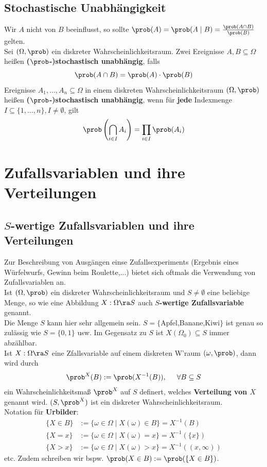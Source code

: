 \documentclass{kit}
\begin{document}
  \subsection{Stochastische Unabhängigkeit}
    Wir $A$ nicht von $B$ beeinflusst, so sollte $\prob(A)=\prob(A\mid B)=\frac{\prob(A\cap B)}{\prob(B)}$ gelten.\\
    Sei $(\Omega,\prob)$ ein diskreter Wahrscheinlichkeitsraum. Zwei Ereignisse $A,B\subseteq\Omega$ heißen
    \textbf{($\prob$-)stochastisch unabhängig}, falls
    $$\prob(A\cap B)=\prob(A)\cdot\prob(B)$$
    Ereignisse $A_1,\dots,A_n\subseteq\Omega$ in einem diskreten Wahrscheinlichkeitsraum $(\Omega,\prob)$ heißen
    \textbf{($\prob$-)stochastisch unabhängig}, wenn für \textbf{jede} Indexmenge $I\subseteq\{1,\dots,n\},I\neq\emptyset$,
    gilt
    $$\prob\left(\bigcap_{i\in I}A_i\right)=\prod_{i\in I}\prob(A_i)$$
\section{Zufallsvariablen und ihre Verteilungen}
  \subsection{\texorpdfstring{$S$}{S}-wertige Zufallsvariablen und ihre Verteilungen}
    Zur Beschreibung von Ausgängen einse Zufallsexperiments (Ergebnis eines Würfelwurfs, Gewinn beim Roulette,...) bietet
    sich oftmals die Verwendung von Zufallsvariablen an.\\
    Ist $(\Omega,\prob)$ ein diskreter Wahrscheinlichkeitsraum und $S\neq\emptyset$ eine beliebige Menge, so wie eine
    Abbildung $X:\Omega\ra S$ auch \textbf{$S$-wertige Zufallsvariable} genannt.\\
    Die Menge $S$ kann hier sehr allgemein sein. $S=\{$Apfel,Banane,Kiwi$\}$ ist genau so zulässig wie $S=\{0,1\}$ usw.
    Im Gegensatz zu $S$ ist $X(\Omega_0)\subseteq S$ immer abzählbar.\\
    Ist $X:\Omega\ra S$ eine Zfallsvariable auf einem diskreten W'raum $(\omega,\prob)$, dann wird durch
    $$\prob^X(B):=\prob(X^{-1}(B)),\hspace{0.5cm}\forall B\subseteq S$$
    ein Wahrscheinlichkeitsmaß $\prob^X$ auf $S$ definert, welches \textbf{Verteilung von $X$} genannt wird. $(S,\prob^X)$
    ist ein diskreter Wahrscheinlichkeitsraum.\\
    Notation für \textbf{Urbilder}:
    $$\begin{aligned}
      \{X\in B\} & := \{\omega\in\Omega\mid X(\omega)\in B\}=X^{-1}(B)\\
      \{X=x\} & := \{\omega\in\Omega\mid X(\omega)=x\}=X^{-1}(\{x\})\\
      \{X>x\} & := \{\omega\in\Omega\mid X(\omega)>x\}=X^{-1}((x,\infty))
    \end{aligned}$$
    etc. Zudem schreiben wir bspw. $\prob(X\in B):=\prob(\{X\in B\})$.
\end{document}
